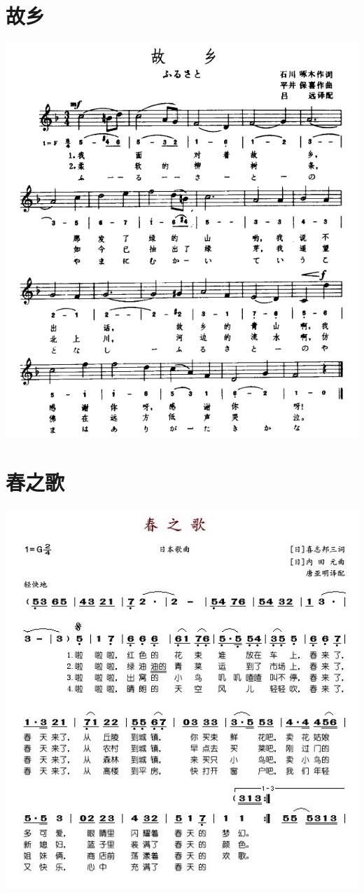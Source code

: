\documentclass[cn,pad,chinese,chinesefont=nofont]{elegantbook}
\begin{document}
\section{故乡}
\includegraphics[width=\textwidth]{dongxiao/日本-故乡.png}

\section{春之歌}
    \includegraphics[height=\textheight]{dongxiao/日本-春之歌.jpg}
\end{document}
